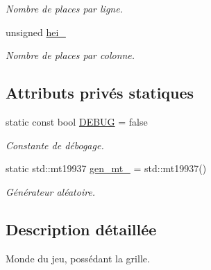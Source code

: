 \begin{DoxyCompactItemize}
\begin{DoxyCompactList}\small\item\em Nombre de places par ligne. \end{DoxyCompactList}\item 
\hypertarget{classWorld_a988746f4879237d7740e52fa36b16555}{unsigned \hyperlink{classWorld_a988746f4879237d7740e52fa36b16555}{hei\-\_\-}}\label{classWorld_a988746f4879237d7740e52fa36b16555}

\begin{DoxyCompactList}\small\item\em Nombre de places par colonne. \end{DoxyCompactList}\end{DoxyCompactItemize}
\subsection*{Attributs privés statiques}
\begin{DoxyCompactItemize}
\item 
\hypertarget{classWorld_a18060cbfd04ea4f7b9d099bd52152e93}{static const bool \hyperlink{classWorld_a18060cbfd04ea4f7b9d099bd52152e93}{D\-E\-B\-U\-G} = false}\label{classWorld_a18060cbfd04ea4f7b9d099bd52152e93}

\begin{DoxyCompactList}\small\item\em Constante de débogage. \end{DoxyCompactList}\item 
\hypertarget{classWorld_ac4f18672fbf891451b559d6c4eb59310}{static std\-::mt19937 \hyperlink{classWorld_ac4f18672fbf891451b559d6c4eb59310}{gen\-\_\-mt\-\_\-} = std\-::mt19937()}\label{classWorld_ac4f18672fbf891451b559d6c4eb59310}

\begin{DoxyCompactList}\small\item\em Générateur aléatoire. \end{DoxyCompactList}\end{DoxyCompactItemize}


\subsection{Description détaillée}
Monde du jeu, possédant la grille. 

